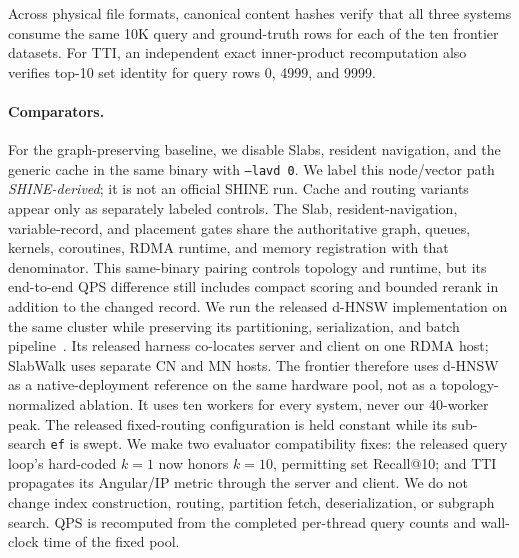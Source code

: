 \documentclass[sigconf,nonacm]{acmart}
\newcommand{\sys}{SlabWalk}
\newcommand{\cn}{CN}
\newcommand{\mn}{MN}
\newcommand{\ef}{\texttt{ef}}
\begin{document}
Across physical file formats, canonical content hashes verify that all three
systems consume the same 10K query and ground-truth rows for each of the ten
frontier datasets.  For TTI, an
independent exact inner-product recomputation also verifies top-10 set identity
for query rows 0, 4999, and 9999.

\paragraph{Comparators.}
For the graph-preserving baseline, we disable Slabs, resident navigation, and
the generic cache in the same binary with \texttt{--lavd 0}.  We label this
node/vector path \emph{SHINE-derived}; it is not an official SHINE run.  Cache
and routing variants appear only as separately labeled
controls.  The Slab, resident-navigation, variable-record, and placement gates
share the authoritative graph, queues, kernels, coroutines, RDMA runtime, and
memory registration with that denominator.  This same-binary pairing controls
topology and runtime, but its end-to-end QPS difference still includes compact
scoring and bounded rerank in addition to the changed record.  We run the
released d-HNSW implementation on the same cluster
while preserving its partitioning, serialization, and batch
pipeline~\cite{dhnsw}.  Its released harness co-locates server and client on one
RDMA host; \sys{} uses separate \cn{} and \mn{} hosts.  The frontier therefore
uses d-HNSW as a native-deployment reference on the same hardware pool, not as
a topology-normalized ablation.  It uses ten workers for every system, never
our 40-worker peak.  The released fixed-routing configuration is held constant
while its sub-search \ef{} is swept.  We make two evaluator
compatibility fixes: the released query loop's hard-coded $k{=}1$ now honors
$k{=}10$, permitting set Recall@10; and TTI propagates its Angular/IP metric
through the server and client.  We do not change index construction, routing,
partition fetch, deserialization, or subgraph search.  QPS is recomputed from
the completed per-thread query counts and wall-clock time of the fixed pool.
\end{document}

